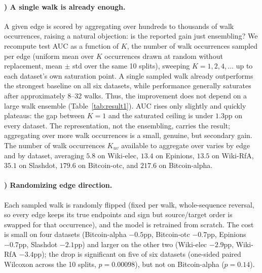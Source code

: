 \documentclass[sigconf]{acmart}
\newcounter{ablation}
\renewcommand{\theablation}{\Alph{ablation}}
\theoremstyle{plain}
\theoremstyle{definition}
\begin{document}
\paragraph{\theablation) A single walk is already enough.}
\label{abl:singlewalk}
A given edge is scored by aggregating over hundreds to thousands of walk occurrences, raising a natural objection: is the reported gain just ensembling? We recompute test AUC as a function of $K$, the number of walk occurrences sampled per edge (uniform mean over $K$ occurrences drawn at random without replacement, mean $\pm$ std over the same 10 splits), sweeping $K=1,2,4,\ldots$ up to each dataset's own saturation point. A single sampled walk already outperforms the strongest baseline on all six datasets, while performance generally saturates after approximately 8--32 walks. Thus, the improvement does not depend on a large walk ensemble (Table~\ref{tab:result1}). AUC rises only slightly and quickly plateaus: the gap between $K=1$ and the saturated ceiling is under $1.3$pp on every dataset. The representation, not the ensembling, carries the result; aggregating over more walk occurrences is a small, genuine, but secondary gain. The number of walk occurrences $K_{uv}$ available to aggregate over varies by edge and by dataset, averaging $5.8$ on Wiki-elec, $13.4$ on Epinions, $13.5$ on Wiki-RfA, $35.1$ on Slashdot, $179.6$ on Bitcoin-otc, and $217.6$ on Bitcoin-alpha.

\paragraph{\theablation) Randomizing edge direction.}
\label{abl:dirflip}
Each sampled walk is randomly flipped (fixed per walk, whole-sequence reversal, so every edge keeps its true endpoints and sign but source/target order is swapped for that occurrence), and the model is retrained from scratch. The cost is small on four datasets (Bitcoin-alpha $-0.5$pp, Bitcoin-otc $-0.7$pp, Epinions $-0.7$pp, Slashdot $-2.1$pp) and larger on the other two (Wiki-elec $-2.9$pp, Wiki-RfA $-3.4$pp); the drop is significant on five of six datasets (one-sided paired Wilcoxon across the 10 splits, $p=0.00098$), but not on Bitcoin-alpha ($p=0.14$).

\end{document}
